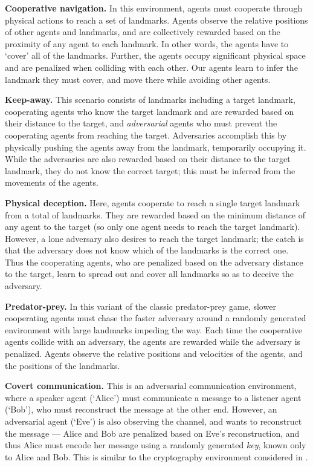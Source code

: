 \documentclass{article}
\begin{document}
\textbf{Cooperative navigation.} In this environment, agents must cooperate through physical actions to reach a set of  landmarks. Agents observe the relative positions of other agents and landmarks, and are collectively rewarded based on the proximity of any agent to each landmark. In other words, the agents have to `cover' all of the landmarks. Further, the agents occupy significant physical space and are penalized when colliding with each other. Our agents learn to infer the landmark they must cover, and move there while avoiding other agents. 

\textbf{Keep-away.} This scenario consists of  landmarks including a target landmark,  cooperating agents who know the target landmark and are rewarded based on their distance to the target, and  \textit{adversarial} agents who must prevent the cooperating agents from reaching the target.  Adversaries accomplish this by physically pushing the agents away from the landmark, temporarily occupying it. While the adversaries are also rewarded based on their distance to the target landmark, they do not know the correct target; this must be inferred from the movements of the agents. 

\textbf{Physical deception.} Here,  agents cooperate to reach a single target landmark from a total of  landmarks. They are rewarded based on the minimum distance of any agent to the target (so only one agent needs to reach the target landmark). However, a lone adversary also desires to reach the target landmark; the catch is that the adversary does not know which of the landmarks is the correct one. Thus the cooperating agents, who are penalized based on the adversary distance to the target, learn to spread out and cover all landmarks so as to deceive the adversary.

\textbf{Predator-prey.} In this variant of the classic predator-prey game,  slower cooperating agents must chase the faster adversary around a randomly generated environment with  large landmarks impeding the way. Each time the cooperative agents collide with an adversary, the agents are rewarded while the adversary is penalized. Agents observe the relative positions and velocities of the agents, and the positions of the landmarks.

\textbf{Covert communication.} This is an adversarial communication environment, where a speaker agent (`Alice') must communicate a message to a listener agent (`Bob'), who must reconstruct the message at the other end. However, an adversarial agent (`Eve') is also observing the channel, and wants to reconstruct the message --- Alice and Bob are penalized based on Eve's reconstruction, and thus Alice must encode her message using a randomly generated \textit{key}, known only to Alice and Bob. This is similar to the cryptography environment considered in \cite{abadi2016learning}.
\end{document}
